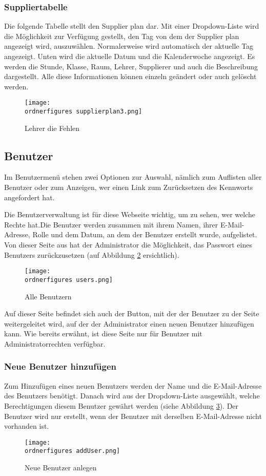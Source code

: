 \subsubsection{Suppliertabelle}
Die folgende Tabelle stellt den Supplier plan dar. Mit einer Dropdown-Liste wird die Möglichkeit zur Verfügung gestellt, den Tag von dem der Supplier plan angezeigt wird, auszuwählen. Normalerweise wird automatisch der aktuelle Tag angezeigt. Unten wird die aktuelle Datum und die Kalenderwoche angezeigt. Es werden die Stunde, Klasse, Raum, Lehrer, Supplierer und auch die Beschreibung dargestellt. Alle diese Informationen können einzeln geändert oder auch gelöscht werden.

\begin{figure}[H]
	\centering
	\texttt{[image: \\ordnerfigures supplierplan3.png]}
	\caption{Lehrer die Fehlen}
	\label{fi:fehlendeLehrer}
\end{figure} 
\subsection{Benutzer}
Im Benutzermenü stehen zwei Optionen zur Auswahl, nämlich zum Auflisten aller Benutzer oder zum Anzeigen, wer einen Link zum Zurücksetzen des Kennworts angefordert hat. 

Die Benutzerverwaltung ist für diese Webseite wichtig, um zu sehen, wer welche Rechte hat.Die Benutzer werden zusammen mit ihrem Namen, ihrer E-Mail-Adresse, Rolle und dem Datum, an dem der Benutzer erstellt wurde, aufgelistet. Von dieser Seite aus hat der Administrator die Möglichkeit, das Passwort eines Benutzers zurückzusetzen (auf Abbildung \ref*{fi:users} ersichtlich).

\begin{figure}[H]
	\centering
	\texttt{[image: \\ordnerfigures users.png]}
	\caption{Alle Benutzern}
	\label{fi:users}
\end{figure}

Auf dieser Seite befindet sich auch der Button, mit der der Benutzer zu der Seite weitergeleitet wird, auf der der Administrator einen neuen Benutzer hinzufügen kann. Wie bereits erwähnt, ist diese Seite nur für Benutzer mit Administratorrechten verfügbar.



\subsubsection{Neue Benutzer hinzufügen}
Zum Hinzufügen eines neuen Benutzers werden der Name und die E-Mail-Adresse des Benutzers benötigt. Danach wird aus der Dropdown-Liste ausgewählt, welche Berechtigungen diesem Benutzer gewährt werden (siehe Abbildung \ref{fi:addUser}). Der Benutzer wird nur erstellt, wenn der Benutzer mit derselben E-Mail-Adresse nicht vorhanden ist. 
\begin{figure}[h]
	\centering
	\texttt{[image: \\ordnerfigures addUser.png]}
	\caption{Neue Benutzer anlegen}
	\label{fi:addUser}
\end{figure}


